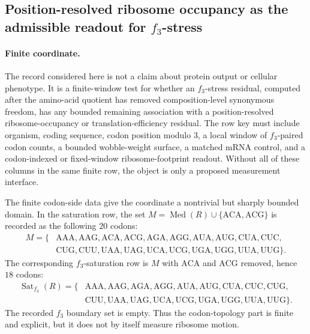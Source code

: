 \subsection{Position-resolved ribosome occupancy as the admissible readout for $f_3$-stress}
\label{subsec:q6-f3-stress-position-resolved-ribosome-occupancy-translation-boundary}

\paragraph{Finite coordinate.}
The record considered here is not a claim about protein output or cellular phenotype. It is a finite-window test for whether an $f_3$-stress residual, computed after the amino-acid quotient has removed composition-level synonymous freedom, has any bounded remaining association with a position-resolved ribosome-occupancy or translation-efficiency residual. The row key must include organism, coding sequence, codon position modulo $3$, a local window of $f_3$-paired codon counts, a bounded wobble-weight surface, a matched mRNA control, and a codon-indexed or fixed-window ribosome-footprint readout. Without all of these columns in the same finite row, the object is only a proposed measurement interface.

The finite codon-side data give the coordinate a nontrivial but sharply bounded domain. In the saturation row, the set $M=\operatorname{Med}(R)\cup\{\mathrm{ACA},\mathrm{ACG}\}$ is recorded as the following $20$ codons:
$$
\begin{aligned}
M=\{&\mathrm{AAA},\mathrm{AAG},\mathrm{ACA},\mathrm{ACG},\mathrm{AGA},\mathrm{AGG},\mathrm{AUA},\mathrm{AUG},\mathrm{CUA},\mathrm{CUC},\\
&\mathrm{CUG},\mathrm{CUU},\mathrm{UAA},\mathrm{UAG},\mathrm{UCA},\mathrm{UCG},\mathrm{UGA},\mathrm{UGG},\mathrm{UUA},\mathrm{UUG}\}.
\end{aligned}
$$
The corresponding $f_3$-saturation row is $M$ with $\mathrm{ACA}$ and $\mathrm{ACG}$ removed, hence $18$ codons:
$$
\begin{aligned}
\operatorname{Sat}_{f_3}(R)=\{&\mathrm{AAA},\mathrm{AAG},\mathrm{AGA},\mathrm{AGG},\mathrm{AUA},\mathrm{AUG},\mathrm{CUA},\mathrm{CUC},\mathrm{CUG},\\
&\mathrm{CUU},\mathrm{UAA},\mathrm{UAG},\mathrm{UCA},\mathrm{UCG},\mathrm{UGA},\mathrm{UGG},\mathrm{UUA},\mathrm{UUG}\}.
\end{aligned}
$$
The recorded $f_3$ boundary set is empty. Thus the codon-topology part is finite and explicit, but it does not by itself measure ribosome motion.

